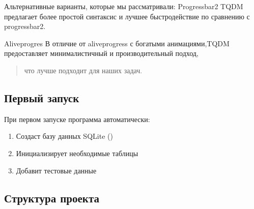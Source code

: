 \documentclass[a4paper,11pt,russian,openany,oneside]{sphinxmanual}
\begin{document}
\sphinxAtStartPar
Альтернативные варианты, которые мы рассматривали:
Progressbar2
TQDM  предлагает более простой синтаксис и лучшее быстродействие по сравнению с progressbar2.

\sphinxAtStartPar
Alive\sphinxhyphen{}progres
В отличие от alive\sphinxhyphen{}progress с богатыми анимациями,TQDM предоставляет минималистичный и производительный подход,
\begin{quote}

\sphinxAtStartPar
что лучше подходит для наших задач.
\end{quote}


\subsection{Первый запуск}
\label{\detokenize{installation:id5}}
\sphinxAtStartPar
При первом запуске программа автоматически:
\begin{enumerate}
%
\item {} 
\sphinxAtStartPar
Создаст базу данных SQLite ()

\item {} 
\sphinxAtStartPar
Инициализирует необходимые таблицы

\item {} 
\sphinxAtStartPar
Добавит тестовые данные

\end{enumerate}


\subsection{Структура проекта}
\label{\detokenize{installation:id6}}
\begin{sphinxVerbatim}[commandchars=\\\{\}]
                     
                
            
          
               
              
               
           
                      
           
\end{sphinxVerbatim}
\end{document}
